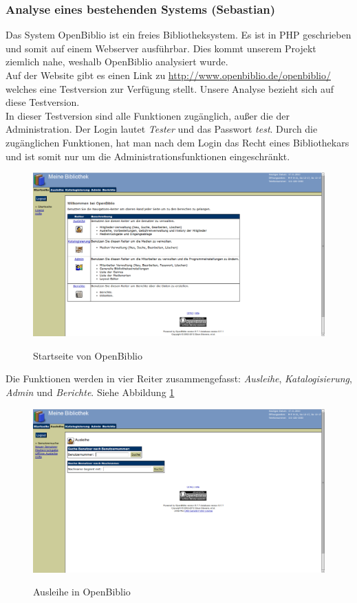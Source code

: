 \documentclass[fontsize=12pt,paper=a4,twoside]{scrartcl}
\begin{document}
\subsubsection{Analyse eines bestehenden Systems (Sebastian)} \label{subsec:Analyse}

Das System OpenBiblio ist ein freies Bibliotheksystem. Es ist in PHP geschrieben und somit auf einem Webserver ausführbar. Dies kommt unserem Projekt ziemlich nahe, weshalb OpenBiblio analysiert wurde.\\
Auf der Website gibt es einen Link zu \url{http://www.openbiblio.de/openbiblio/} welches eine Testversion zur Verfügung stellt. Unsere Analyse bezieht sich auf diese Testversion.\\
In dieser Testversion sind alle Funktionen zugänglich, außer die der Administration. Der Login lautet \emph{Tester} und das Passwort \emph{test}. Durch die zugänglichen Funktionen, hat man nach dem Login das Recht eines Bibliothekars und ist somit nur um die Administrationsfunktionen eingeschränkt. 
\begin{figure}
	[H] \caption{Startseite von OpenBiblio} 
	\includegraphics[width=1 
	\textwidth]{OpenBiblio/startseite_loggedin.png} \label{startseite-openbiblio} 
\end{figure}
\newpage Die Funktionen werden in vier Reiter zusammengefasst: \emph{Ausleihe}, \emph{Katalogisierung}, \emph{Admin} und \emph{Berichte}. Siehe Abbildung \ref{startseite-openbiblio}\\
\begin{figure}
	[H] \caption{Ausleihe in OpenBiblio} 
	\includegraphics[width=1 
	\textwidth]{OpenBiblio/reiter_ausleihe.png} \label{ausleihe-openbiblio} 
\end{figure}
\end{document}
